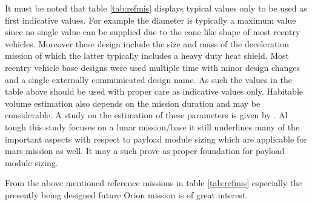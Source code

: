 It must be noted that table \ref{tab:refmis} displays typical values only to be used as first indicative values. For example the diameter is typically a maximum value since no single value can be supplied due to the cone like shape of most reentry vehicles. Moreover these design include the size and mass of the deceleration mission of which the latter typically includes a heavy duty heat shield. Most reentry vehicle base designs were used multiple time with minor design changes and a single externally communicated design name. As such the values in the table above should be used with proper care as indicative values only. Habitable volume estimation also depends on the mission duration and may be considerable. A study on the estimation of these parameters is given by \cite{Rudisill}. Al tough this study focuses on a lunar mission/base it still underlines many of the important aspects with respect to payload module sizing which are applicable for mars mission as well. It may a such prove as proper foundation for payload module sizing. 

From the above mentioned reference missions in table \ref{tab:refmis} especially the presently being designed future Orion mission is of great interest.  